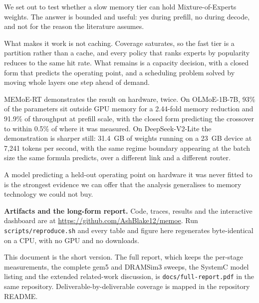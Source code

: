 \documentclass[10pt,a4paper]{article}
\begin{document}
We set out to test whether a slow memory tier can hold Mixture-of-Experts weights.
The answer is bounded and useful: yes during prefill, no during decode, and not
for the reason the literature assumes.

What makes it work is not caching. Coverage saturates, so the fast
tier is a partition rather than a cache, and every policy that ranks experts by
popularity reduces to the same hit rate. What remains is a capacity decision, with
a closed form that predicts the operating point, and a scheduling problem solved
by moving whole layers one step ahead of demand.

MEMoE-RT demonstrates the result on hardware, twice. On OLMoE-1B-7B, 93\% of the
parameters sit outside GPU memory for a 2.44-fold memory reduction and 91.9\% of
throughput at prefill scale, with the closed form predicting the crossover to
within 0.5\% of where it was measured. On DeepSeek-V2-Lite the demonstration is
sharper still: 31.4~GB of weights running on a 23~GB device at 7{,}241 tokens
per second, with the same regime boundary appearing at the batch size the same
formula predicts, over a different link and a different router.

A model predicting a held-out operating point on hardware it was never fitted to
is the strongest evidence we can offer that the analysis generalises to memory
technology we could not buy.

\vspace{6pt}
\noindent\textbf{Artifacts and the long-form report.} Code, traces, results and
the interactive dashboard are at \url{https://github.com/AshBlake12/memoe}. Run
\texttt{scripts/reproduce.sh} and every table and figure here regenerates
byte-identical on a CPU, with no GPU and no downloads.

\noindent This document is the short version. The full report, which keeps the
per-stage measurements, the complete gem5 and DRAMSim3 sweeps, the SystemC
model listing and the extended related-work discussion, is
\texttt{docs/full-report.pdf} in the same repository. Deliverable-by-deliverable
coverage is mapped in the repository README.
\end{document}
